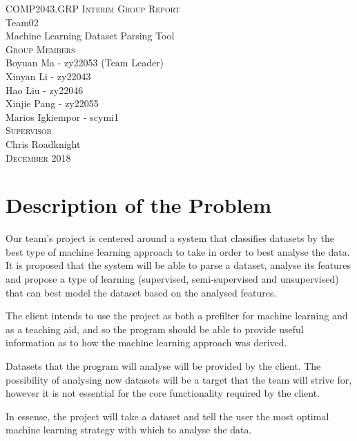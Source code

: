 \documentclass[titlepage]{article}
\begin{document}
\begin{titlepage}
  \centering
  \large{\textsc{COMP2043.GRP Interim Group Report}}\\
  \vspace{3cm}
  \huge{Team02}\\
  \Huge{Machine Learning Dataset Parsing Tool}\\
  \vspace{3cm}
  \LARGE{\textsc{Group Members}}\\
  \Large{Boyuan Ma - zy22053 (Team Leader)}\\
  \Large{Xinyan Li - zy22043}\\
  \Large{Hao Liu - zy22046}\\
  \Large{Xinjie Pang - zy22055}\\
  \Large{Marios Igkiempor - scymi1}\\
  \vspace{1cm}
  \LARGE{\textsc{Supervisor}}\\
  \Large{Chris Roadknight}\\
  \vfill
  \large{\textsc{December 2018}}
  
\end{titlepage}

\tableofcontents
\pagebreak

\section{Description of the Problem}
Our team's project is centered around a system that classifies datasets by the best type of machine learning approach to take in order to best analyse the data. It is proposed that the system will be able to parse a dataset, analyse its features and propose a type of learning (supervised, semi-supervised and unsupervised) that can best model the dataset based on the analysed features.

The client intends to use the project as both a prefilter for machine learning and as a teaching aid, and so the program should be able to provide useful information as to how the machine learning approach was derived.

Datasets that the program will analyse will be provided by the client. The possibility of analysing new datasets will be a target that the team will strive for, however it is not essential for the core functionality required by the client.

In essense, the project will take a dataset and tell the user the most optimal machine learning strategy with which to analyse the data.
\end{document}
